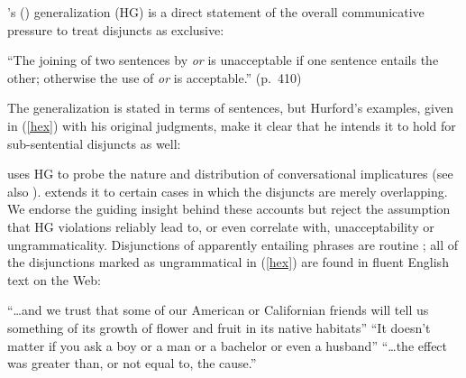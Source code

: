 \documentclass[12pt,twoside]{article}
\newcommand{\eg}[1]{(\ref{#1})}
\newcommand{\posscitet}[1]{\citeauthor{#1}'s (\citeyear{#1})}
\newcommand{\word}[1]{\emph{#1}}
\newcommand{\highlight}[1]{{\color{maroon}#1}}
\renewcommand{\_}{\textbf{\textunderscore\hspace{-4pt}\textunderscore\hspace{-3pt}\textunderscore\hspace{-4pt}\textunderscore}\hspace{0.5pt}}			%
\begin{document}
\posscitet{Hurford:1974} generalization (HG) is a direct statement of
the overall communicative pressure to treat disjuncts as exclusive:
%
\begin{exe}
\item
  ``The joining of two sentences by \word{or} is unacceptable if one
  sentence entails the other; otherwise the use of \word{or} is
  acceptable.'' (p.~410)
\end{exe}
%
The generalization is stated in terms of sentences, but Hurford's
examples, given in \eg{hex} with his original judgments, make it clear
that he intends it to hold for sub-sentential disjuncts as well:
%
\begin{exe}
\ex\label{hex}
  \begin{xlist}
  \end{xlist}
\end{exe}

\citeauthor{Hurford:1974} uses HG to probe the nature and distribution
of conversational implicatures (see also
\citealt{Gazdar79b,ChierchiaFoxSpector08}). \citet{Singh:2008} extends
it to certain cases in which the disjuncts are merely overlapping. We
endorse the guiding insight behind these accounts but reject the
assumption that HG violations reliably lead to, or even correlate
with, unacceptability or ungrammaticality. Disjunctions of apparently
entailing phrases are routine \citep{Simons:2001}; all of the
disjunctions marked as ungrammatical in \eg{hex} are found in fluent
English text on the Web:
%
\begin{exe}
\ex\label{hex-good}
  \begin{xlist}
  \ex ``\ldots and we trust that some of our \highlight{American or
      Californian} friends will tell us something of its growth of
    flower and fruit in its native habitats''
  \ex ``It doesn't matter if you ask \highlight{a boy or a man or a
      bachelor or even a husband}''
  \ex ``\ldots the effect was \highlight{greater than, or not equal to,}
    the cause.''
  \end{xlist}
\end{exe}
\end{document}
